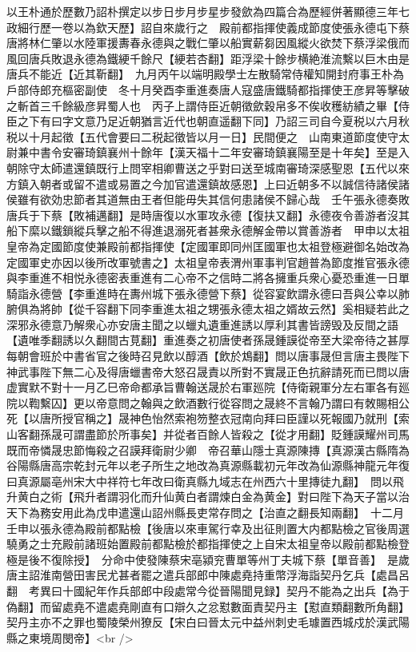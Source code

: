 以王朴通於歷數乃詔朴撰定以步日步月步星步發歛為四篇合為歷經併著顯德三年七政細行歷一卷以為欽天歷】詔自來歲行之　殿前都指揮使義成節度使張永德屯下蔡唐將林仁肇以水陸軍援夀春永德與之戰仁肇以船實薪芻因風縱火欲焚下蔡浮梁俄而風回唐兵敗退永德為鐵綆千餘尺【綆若杏翻】距浮梁十餘步横絶淮流繫以巨木由是唐兵不能近【近其靳翻】　九月丙午以端明殿學士左散騎常侍權知開封府事王朴為戶部侍郎充樞密副使　冬十月癸酉李重進奏唐人寇盛唐鐵騎都指揮使王彦昇等擊破之斬首三千餘級彦昇蜀人也　丙子上謂侍臣近朝徵歛穀帛多不俟收穫紡績之畢【侍臣之下有曰字文意乃足近朝猶言近代也朝直遥翻下同】乃詔三司自今夏税以六月秋税以十月起徵【五代會要曰二税起徵皆以月一日】民間便之　山南東道節度使守太尉兼中書令安審琦鎮襄州十餘年【漢天福十二年安審琦鎮襄陽至是十年矣】至是入朝除守太師遣還鎮既行上問宰相卿曹送之乎對曰送至城南審琦深感聖恩【五代以來方鎮入朝者或留不遣或易置之今加官遣還鎮故感恩】上曰近朝多不以誠信待諸侯諸侯雖有欲効忠節者其道無由王者但能毋失其信何患諸侯不歸心哉　壬午張永德奏敗唐兵于下蔡【敗補邁翻】是時唐復以水軍攻永德【復扶又翻】永德夜令善游者沒其船下縻以鐵鎖縱兵擊之船不得進退溺死者甚衆永德解金帶以賞善游者　甲申以太祖皇帝為定國節度使兼殿前都指揮使【定國軍即同州匡國軍也太祖登極避御名始改為定國軍史亦因以後所改軍號書之】太祖皇帝表渭州軍事判官趙普為節度推官張永德與李重進不相悦永德密表重進有二心帝不之信時二將各擁重兵衆心憂恐重進一日單騎詣永德營【李重進時在夀州城下張永德營下蔡】從容宴飲謂永德曰吾與公幸以肺腑俱為將帥【從千容翻下同李重進太祖之甥張永德太祖之婿故云然】奚相疑若此之深邪永德意乃解衆心亦安唐主聞之以蠟丸遺重進誘以厚利其書皆謗毁及反間之語【遺唯季翻誘以久翻間古莧翻】重進奏之初唐使者孫晟鍾謨從帝至大梁帝待之甚厚每朝會班於中書省官之後時召見飲以醇酒【飲於鴆翻】問以唐事晟但言唐主畏陛下神武事陛下無二心及得唐蠟書帝大怒召晟責以所對不實晟正色抗辭請死而已問以唐虚實默不對十一月乙巳帝命都承旨曹翰送晟於右軍廵院【侍衛親軍分左右軍各有廵院以鞫繫囚】更以帝意問之翰與之飲酒數行從容問之晟終不言翰乃謂曰有敇賜相公死【以唐所授官稱之】晟神色怡然索袍笏整衣冠南向拜曰臣謹以死報國乃就刑【索山客翻孫晟可謂盡節於所事矣】并從者百餘人皆殺之【從才用翻】貶鍾謨耀州司馬既而帝憐晟忠節悔殺之召謨拜衛尉少卿　帝召華山隱士真源陳摶【真源漢古縣隋為谷陽縣唐高宗乾封元年以老子所生之地改為真源縣載初元年改為仙源縣神龍元年復曰真源屬亳州宋大中祥符七年改曰衛真縣九域志在州西六十里摶徒九翻】　問以飛升黄白之術【飛升者謂羽化而升仙黄白者謂煉白金為黄金】對曰陛下為天子當以治天下為務安用此為戊申遣還山詔州縣長吏常存問之【治直之翻長知兩翻】　十二月壬申以張永德為殿前都點檢【後唐以來車駕行幸及出征則置大内都點檢之官後周選驍勇之士充殿前諸班始置殿前都點檢於都指揮使之上自宋太祖皇帝以殿前都點檢登極是後不復除授】　分命中使發陳蔡宋亳潁兖曹單等州丁夫城下蔡【單音善】　是歲唐主詔淮南營田害民尤甚者罷之遣兵部郎中陳處堯持重幣浮海詣契丹乞兵【處昌呂翻　考異曰十國紀年作兵部郎中段處常今從晉陽聞見録】契丹不能為之出兵【為于偽翻】而留處堯不遣處堯剛直有口辯久之忿懟數面責契丹主【懟直類翻數所角翻】契丹主亦不之罪也蜀陵榮州獠反【宋白曰晉太元中益州刺史毛璩置西城戍於漢武陽縣之東境周閔帝】<br />
